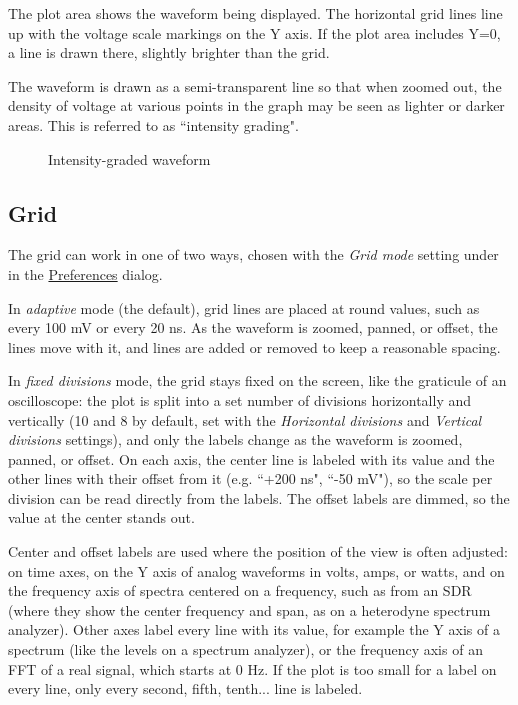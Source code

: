 The plot area shows the waveform being displayed. The horizontal grid lines line up with the voltage scale markings on
the Y axis. If the plot area includes Y=0, a line is drawn there, slightly brighter than the grid.

The waveform is drawn as a semi-transparent line so that when zoomed out, the density of voltage at various points in
the graph may be seen as lighter or darker areas. This is referred to as ``intensity grading".

\begin{figure}[H]
\centering
{}
\caption{Intensity-graded waveform}
\label{graded-waveform2}
\end{figure}

\subsection{Grid}
\label{sec:grid}

The grid can work in one of two ways, chosen with the \emph{Grid mode} setting under 
in the \hyperref[dlg:preferences]{Preferences} dialog.

In \emph{adaptive} mode (the default), grid lines are placed at round values, such as every 100 mV or every 20 ns.
As the waveform is zoomed, panned, or offset, the lines move with it, and lines are added or removed to keep a
reasonable spacing.

In \emph{fixed divisions} mode, the grid stays fixed on the screen, like the graticule of an oscilloscope: the plot is
split into a set number of divisions horizontally and vertically (10 and 8 by default, set with the \emph{Horizontal
divisions} and \emph{Vertical divisions} settings), and only the labels change as the waveform is zoomed, panned, or
offset. On each axis, the center line is labeled with its value and the other lines with their offset from it (e.g.
``+200 ns", ``-50 mV"), so the scale per division can be read directly from the labels. The offset labels are dimmed, so the
value at the center stands out.

Center and offset labels are used where the position of the view is often adjusted: on time axes, on the Y axis of
analog waveforms in volts, amps, or watts, and on the frequency axis of spectra centered on a frequency, such as from
an SDR (where they show the center frequency and span, as on a heterodyne spectrum analyzer). Other axes label every
line with its value, for example the Y axis of a spectrum (like the levels on a spectrum analyzer), or the frequency
axis of an FFT of a real signal, which starts at 0 Hz. If the plot is too small for a
label on every line, only every second, fifth, tenth... line is labeled.

